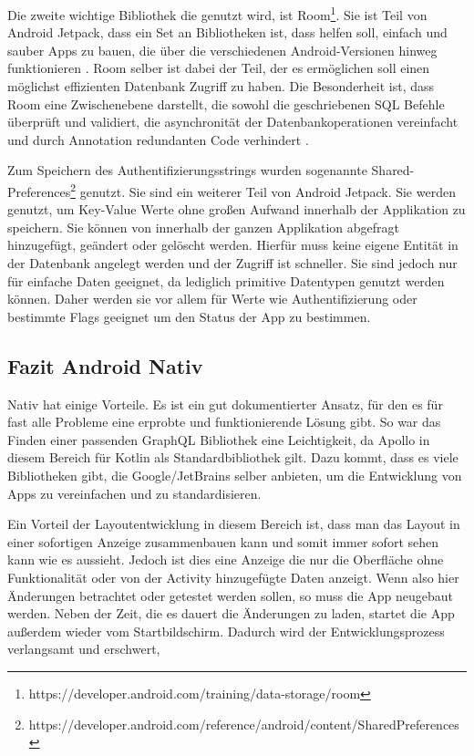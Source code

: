 Die zweite wichtige Bibliothek die genutzt wird, ist Room\footnote{https://developer.android.com/training/data-storage/room}. Sie ist Teil von Android Jetpack, dass ein Set an Bibliotheken ist, dass helfen soll, einfach und sauber Apps zu bauen, die über die verschiedenen Android-Versionen hinweg funktionieren \cite{Jetpack_android}. Room selber ist dabei der Teil, der es ermöglichen soll einen möglichst effizienten Datenbank Zugriff zu haben. 
Die Besonderheit ist, dass Room eine Zwischenebene darstellt, die sowohl die geschriebenen SQL Befehle überprüft und validiert, die asynchronität der Datenbankoperationen vereinfacht und durch Annotation redundanten Code verhindert \cite{Room_docs}.

Zum Speichern des Authentifizierungsstrings wurden sogenannte Shared-Preferences\footnote{https://developer.android.com/reference/android/content/SharedPreferences} genutzt. Sie sind ein weiterer Teil von Android Jetpack. Sie werden genutzt, um Key-Value Werte ohne großen Aufwand innerhalb der Applikation zu speichern. Sie können von innerhalb der ganzen Applikation abgefragt hinzugefügt, geändert oder gelöscht werden. Hierfür muss keine eigene Entität in der Datenbank angelegt werden und der Zugriff ist schneller. Sie sind jedoch nur für einfache Daten geeignet, da lediglich primitive Datentypen genutzt werden können. Daher werden sie vor allem für Werte wie Authentifizierung oder bestimmte Flags geeignet um den Status der App zu bestimmen.


\subsection{Fazit Android Nativ}
Nativ hat einige Vorteile. Es ist ein gut dokumentierter Ansatz, für den es für fast alle Probleme eine erprobte und funktionierende Lösung gibt. So war das Finden einer passenden GraphQL Bibliothek eine Leichtigkeit, da Apollo in diesem Bereich für Kotlin als Standardbibliothek gilt. Dazu kommt, dass es viele Bibliotheken gibt, die Google/JetBrains selber anbieten, um die Entwicklung von Apps zu vereinfachen und zu standardisieren.

Ein Vorteil der Layoutentwicklung in diesem Bereich ist, dass man das Layout in einer sofortigen Anzeige zusammenbauen kann und somit immer sofort sehen kann wie es aussieht. Jedoch ist dies eine Anzeige die nur die Oberfläche ohne Funktionalität oder von der Activity hinzugefügte Daten anzeigt. Wenn also hier Änderungen betrachtet oder getestet werden sollen, so muss die App neugebaut werden. Neben der Zeit, die es dauert die Änderungen zu laden, startet die App außerdem wieder vom Startbildschirm. Dadurch wird der Entwicklungsprozess verlangsamt und erschwert,
